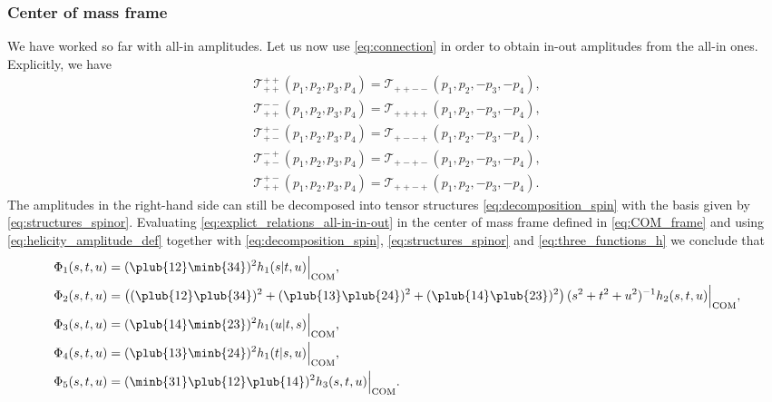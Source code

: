 
\subsubsection{Center of mass frame}
We have worked so far with all-in amplitudes. Let us now use \eqref{eq:connection} in order to obtain in-out amplitudes from the all-in ones. Explicitly, we have
\begin{equation}
	\label{eq:explict_relations_all-in-in-out}
	\begin{aligned}
\mathcal{T}^{++}_{++}(p_1,p_2,p_3,p_4)=\mathcal{T}_{++--}(p_1,p_2,-p_3,-p_4),\\
\mathcal{T}^{--}_{++}(p_1,p_2,p_3,p_4)=\mathcal{T}_{++++}(p_1,p_2,-p_3,-p_4),\\
\mathcal{T}^{+-}_{+-}(p_1,p_2,p_3,p_4)=\mathcal{T}_{+--+}(p_1,p_2,-p_3,-p_4),\\
\mathcal{T}^{-+}_{+-}(p_1,p_2,p_3,p_4)=\mathcal{T}_{+-+-}(p_1,p_2,-p_3,-p_4),\\
\mathcal{T}^{+-}_{++}(p_1,p_2,p_3,p_4)=\mathcal{T}_{++-+}(p_1,p_2,-p_3,-p_4).
	\end{aligned}
\end{equation}
The amplitudes in the right-hand side can still be decomposed into tensor structures \eqref{eq:decomposition_spin} with the basis given by \eqref{eq:structures_spinor}. Evaluating \eqref{eq:explict_relations_all-in-in-out} in the center of mass frame defined in \eqref{eq:COM_frame} and using \eqref{eq:helicity_amplitude_def} together with \eqref{eq:decomposition_spin}, \eqref{eq:structures_spinor} and \eqref{eq:three_functions_h} we conclude that
\begin{equation}
	\label{eq:relation_com_spin}
	\begin{aligned}
		\Phi_1(s,t,u)&= (\plub{12}\minb{34})^{2}h_1(s|t,u)\Big|_\text{COM}, \\
		\Phi_2(s,t,u)&= \left((\plub{12}\plub{34})^2+(\plub{13}\plub{24})^2+(\plub{14}\plub{23})^2\right)  (s^2+t^2+u^2)^{-1} h_2(s,t,u)\Big|_\text{COM}, \\
		\Phi_3(s,t,u)&= (\plub{14}\minb{23})^{2}h_1(u|t,s)\Big|_\text{COM},  \\
		\Phi_4(s,t,u)&= (\plub{13}\minb{24})^{2}h_1(t|s,u)\Big|_\text{COM},  \\
		\Phi_5(s,t,u)&= (\minb{31}\plub{12}\plub{14})^2 h_3(s,t,u)\Big|_\text{COM}.
	\end{aligned}
\end{equation}


